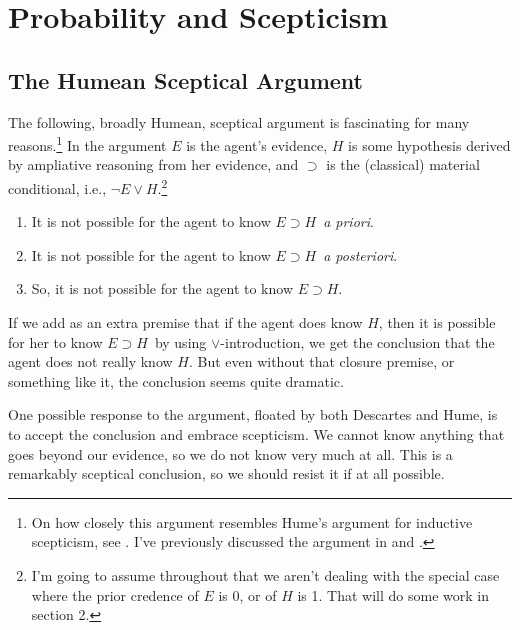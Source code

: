 \newcommand{\ECH}{$E \supset H$}
\newcommand{\mECH}{E \supset H}
\newcommand{\apr}{\textit{a priori}}
\newcommand{\apo}{\textit{a posteriori}}

\chapter[Probability and Scepticism]{Probability and Scepticism}


\section{The Humean Sceptical Argument}
The following, broadly Humean, sceptical argument is fascinating for many reasons.\footnote{On how closely this argument resembles Hume's argument for inductive scepticism, see \citet{Okasha2001, Okasha2005}. I've previously discussed the argument in \citet{WeathersonSRE} and \citet{Weatherson2007}.} In the argument $E$ is the agent's evidence,  $H$ is some hypothesis derived by ampliative reasoning from her evidence, and $\supset$ is the (classical) material conditional, i.e., $\neg E \vee H$.\footnote{\label{footnote:PosProb}I'm going to assume throughout that we aren't dealing with the special case where the prior credence of $E$ is 0, or of $H$ is 1. That will do some work in section 2.}

\begin{enumerate}
\item It is not possible for the agent to know \ECH\ \apr.
\item It is not possible for the agent to know \ECH\ \apo.
\item So, it is not possible for the agent to know \ECH.
\end{enumerate}

\noindent If we add as an extra premise that if the agent does know $H$, then it is possible for her to know \ECH\ by using $\vee$-introduction, we get the conclusion that the agent does not really know $H$. But even without that closure premise, or something like it, the conclusion seems quite dramatic.

One possible response to the argument, floated by both Descartes and Hume, is to accept the conclusion and embrace scepticism. We cannot know anything that goes beyond our evidence, so we do not know very much at all. This is a remarkably sceptical conclusion, so we should resist it if at all possible.

